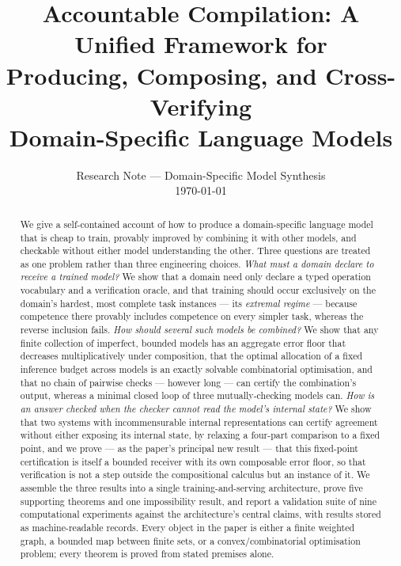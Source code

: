 \documentclass[11pt,twocolumn,a4paper]{article}
\title{\textbf{Accountable Compilation: A Unified Framework for\\[3pt]
Producing, Composing, and Cross-Verifying\\
Domain-Specific Language Models}}
\author{Research Note --- Domain-Specific Model Synthesis\\
\small \today}
\theoremstyle{rdm}
\theoremstyle{definition}
\theoremstyle{remark}
\begin{document}
\maketitle

\begin{abstract}
\noindent
We give a self-contained account of how to produce a domain-specific language
model that is cheap to train, provably improved by combining it with other
models, and checkable without either model understanding the other. Three
questions are treated as one problem rather than three engineering
choices. \emph{What must a domain declare to receive a trained model?} We show
that a domain need only declare a typed operation vocabulary and a
verification oracle, and that training should occur exclusively on the
domain's hardest, most complete task instances --- its \emph{extremal
regime} --- because competence there provably includes competence on every
simpler task, whereas the reverse inclusion fails. \emph{How should several
such models be combined?} We show that any finite collection of imperfect,
bounded models has an aggregate error floor that decreases multiplicatively
under composition, that the optimal allocation of a fixed inference budget
across models is an exactly solvable combinatorial optimisation, and that no
chain of pairwise checks --- however long --- can certify the combination's
output, whereas a minimal closed loop of three mutually-checking models can.
\emph{How is an answer checked when the checker cannot read the model's
internal state?} We show that two systems with incommensurable internal
representations can certify agreement without either exposing its internal
state, by relaxing a four-part comparison to a fixed point, and we prove ---
as the paper's principal new result --- that this fixed-point certification
is itself a bounded receiver with its own composable error floor, so that
verification is not a step outside the compositional calculus but an
instance of it. We assemble the three results into a single training-and-serving
architecture, prove five supporting theorems and one impossibility result, and
report a validation suite of nine computational experiments against the
architecture's central claims, with results stored as machine-readable
records. Every object in the paper is either a finite weighted graph, a
bounded map between finite sets, or a convex/combinatorial optimisation
problem; every theorem is proved from stated premises alone.
\end{abstract}
\end{document}
